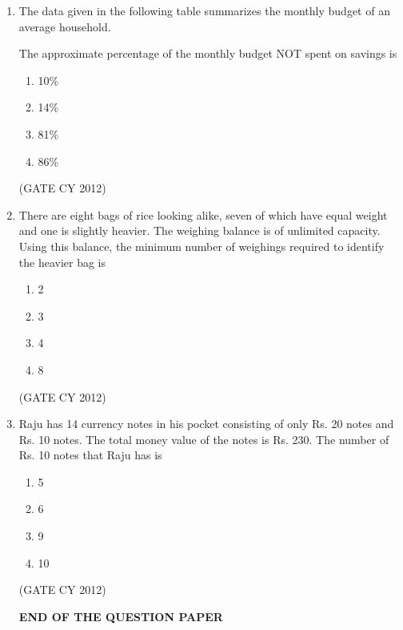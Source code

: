 \documentclass[12pt]{article}
\begin{document}
\begin{enumerate}
    \item The data given in the following table summarizes the monthly budget of an average household.

    
    \captionsetup{type=table}

    

    The approximate percentage of the monthly budget NOT spent on savings is
    \begin{multicols}{2}
        \begin{enumerate}
            \item 10\%
            \item 14\%
            \item 81\%
            \item 86\%
        \end{enumerate}
    \end{multicols}
    \hfill (GATE CY 2012)

    \item There are eight bags of rice looking alike, seven of which have equal weight and one is slightly heavier. The weighing balance is of unlimited capacity. Using this balance, the minimum number of weighings required to identify the heavier bag is
    \begin{multicols}{2}
        \begin{enumerate}
            \item 2
            \item 3
            \item 4
            \item 8
        \end{enumerate}
    \end{multicols}
    \hfill (GATE CY 2012)

    \item Raju has 14 currency notes in his pocket consisting of only Rs. 20 notes and Rs. 10 notes. The total money value of the notes is Rs. 230. The number of Rs. 10 notes that Raju has is
    \begin{multicols}{2}
        \begin{enumerate}
            \item 5
            \item 6
            \item 9
            \item 10
        \end{enumerate}
    \end{multicols}
    \hfill (GATE CY 2012)


\begin{center}
\textbf{END OF THE QUESTION PAPER}
\end{center}



\end{enumerate}
\end{document}
